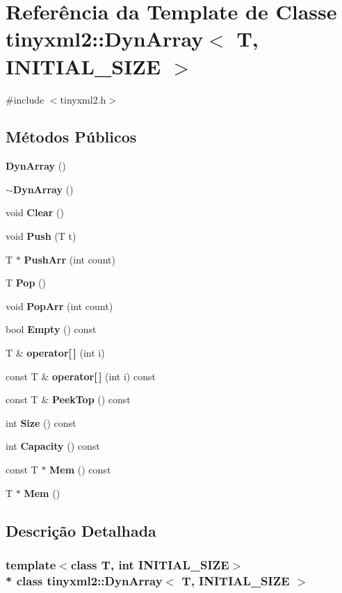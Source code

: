 \section{Referência da Template de Classe tinyxml2\+:\+:Dyn\+Array$<$ T, I\+N\+I\+T\+I\+A\+L\+\_\+\+S\+I\+ZE $>$}
\label{classtinyxml2_1_1_dyn_array}


{\ttfamily \#include $<$tinyxml2.\+h$>$}

\subsection*{Métodos Públicos}
\begin{DoxyCompactItemize}
\item 
{\bf Dyn\+Array} ()
\item 
{\bf $\sim$\+Dyn\+Array} ()
\item 
void {\bf Clear} ()
\item 
void {\bf Push} (T t)
\item 
T $\ast$ {\bf Push\+Arr} (int count)
\item 
T {\bf Pop} ()
\item 
void {\bf Pop\+Arr} (int count)
\item 
bool {\bf Empty} () const 
\item 
T \& {\bf operator[$\,$]} (int i)
\item 
const T \& {\bf operator[$\,$]} (int i) const 
\item 
const T \& {\bf Peek\+Top} () const 
\item 
int {\bf Size} () const 
\item 
int {\bf Capacity} () const 
\item 
const T $\ast$ {\bf Mem} () const 
\item 
T $\ast$ {\bf Mem} ()
\end{DoxyCompactItemize}


\subsection{Descrição Detalhada}
\subsubsection*{template$<$class T, int I\+N\+I\+T\+I\+A\+L\+\_\+\+S\+I\+ZE$>$\\*
class tinyxml2\+::\+Dyn\+Array$<$ T, I\+N\+I\+T\+I\+A\+L\+\_\+\+S\+I\+Z\+E $>$}



